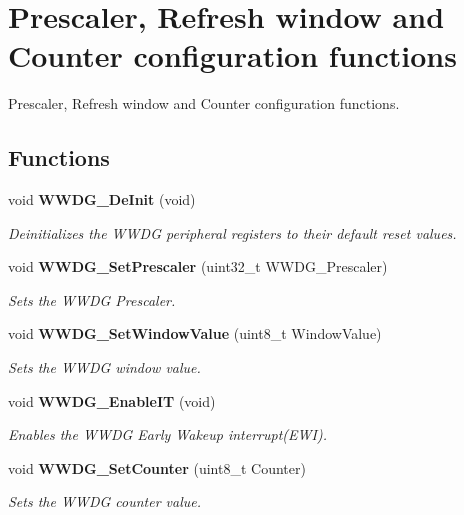 \section{Prescaler, Refresh window and Counter configuration functions}
\label{group__WWDG__Group1}


Prescaler, Refresh window and Counter configuration functions.  


\subsection*{Functions}
\begin{DoxyCompactItemize}
\item 
void \textbf{ W\+W\+D\+G\+\_\+\+De\+Init} (void)
\begin{DoxyCompactList}\small\item\em Deinitializes the W\+W\+DG peripheral registers to their default reset values. \end{DoxyCompactList}\item 
void \textbf{ W\+W\+D\+G\+\_\+\+Set\+Prescaler} (uint32\+\_\+t W\+W\+D\+G\+\_\+\+Prescaler)
\begin{DoxyCompactList}\small\item\em Sets the W\+W\+DG Prescaler. \end{DoxyCompactList}\item 
void \textbf{ W\+W\+D\+G\+\_\+\+Set\+Window\+Value} (uint8\+\_\+t Window\+Value)
\begin{DoxyCompactList}\small\item\em Sets the W\+W\+DG window value. \end{DoxyCompactList}\item 
void \textbf{ W\+W\+D\+G\+\_\+\+Enable\+IT} (void)
\begin{DoxyCompactList}\small\item\em Enables the W\+W\+DG Early Wakeup interrupt(\+E\+W\+I). \end{DoxyCompactList}\item 
void \textbf{ W\+W\+D\+G\+\_\+\+Set\+Counter} (uint8\+\_\+t Counter)
\begin{DoxyCompactList}\small\item\em Sets the W\+W\+DG counter value. \end{DoxyCompactList}\end{DoxyCompactItemize}


